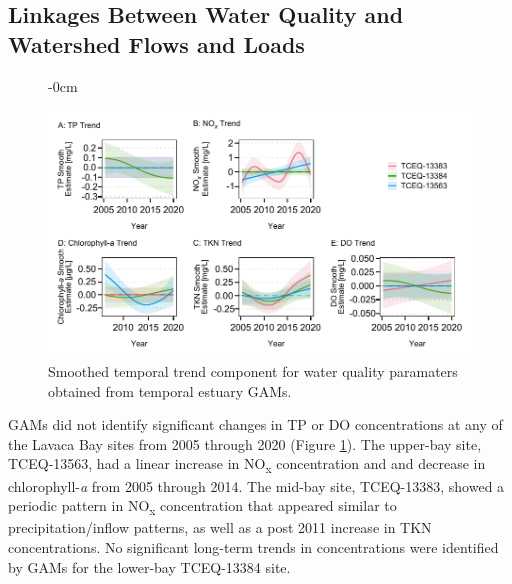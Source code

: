 \documentclass[water,article,submit,oneauthor]{Definitions/mdpi}
\begin{document}
\hypertarget{linkages-between-water-quality-and-watershed-flows-and-loads}{%
\subsection{Linkages Between Water Quality and Watershed Flows and
Loads}\label{linkages-between-water-quality-and-watershed-flows-and-loads}}

\begin{figure}\begin{adjustwidth}{-\extralength}{0cm}

{\centering \includegraphics[width=1\linewidth]{Schramm-Manuscript-2023_files/figure-latex/fig5-1} 

}

\end{adjustwidth}\caption[Smoothed temporal trend component for water quality paramaters obtained from temporal estuary GAMs]{Smoothed temporal trend component for water quality paramaters obtained from temporal estuary GAMs.}\label{fig:fig5}
\end{figure}

GAMs did not identify significant changes in TP or DO concentrations at
any of the Lavaca Bay sites from 2005 through 2020 (Figure
\ref{fig:fig5}). The upper-bay site, TCEQ-13563, had a linear increase
in NO\textsubscript{x} concentration and and decrease in
chlorophyll-\emph{a} from 2005 through 2014. The mid-bay site,
TCEQ-13383, showed a periodic pattern in NO\textsubscript{x}
concentration that appeared similar to precipitation/inflow patterns, as
well as a post 2011 increase in TKN concentrations. No significant
long-term trends in concentrations were identified by GAMs for the
lower-bay TCEQ-13384 site.
\end{document}
